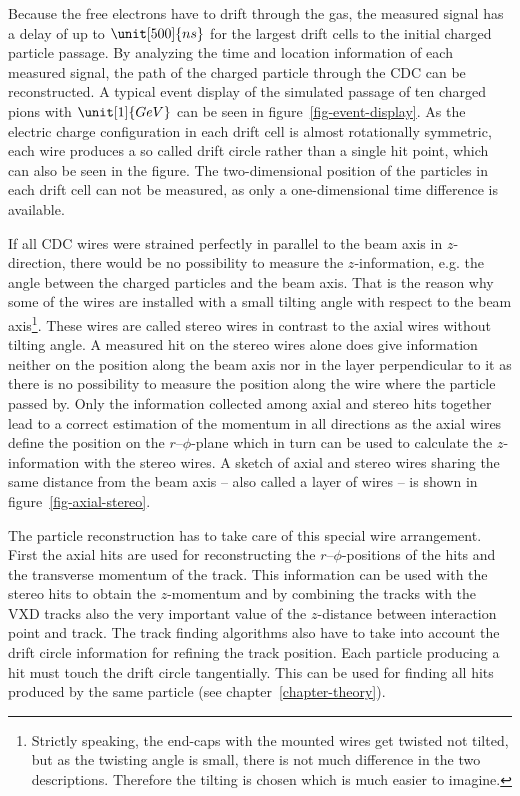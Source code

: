 Because the free electrons have to drift through the gas, the measured signal has a delay of up to $\unit[500]{ns}$ for the largest drift cells to the initial charged particle passage. By analyzing the time and location information of each measured signal, the path of the charged particle through the CDC can be reconstructed. A typical event display of the simulated passage of ten charged pions with $\unit[1]{GeV}$ can be seen in figure~\ref{fig-event-display}. As the electric charge configuration in each drift cell is almost rotationally symmetric, each wire produces a so called drift circle rather than a single hit point, which can also be seen in the figure. The two-dimensional position of the particles in each drift cell can not be measured, as only a one-dimensional time difference is available.

If all CDC wires were strained perfectly in parallel to the beam axis in $z$-direction, there would be no possibility to measure the $z$-information, e.g. the angle between the charged particles and the beam axis. That is the reason why some of the wires are installed with a small tilting angle with respect to the beam axis\footnote{Strictly speaking, the end-caps with the mounted wires get twisted not tilted, but as the twisting angle is small, there is not much difference in the two descriptions. Therefore the tilting is chosen which is much easier to imagine.}. These wires are called stereo wires in contrast to the axial wires without tilting angle. A measured hit on the stereo wires alone does give information neither on the position along the beam axis nor in the layer perpendicular to it as there is no possibility to measure the position along the wire where the particle passed by. Only the information collected among axial and stereo hits together lead to a correct estimation of the momentum in all directions as the axial wires define the position on the $r$--$\phi$-plane which in turn can be used to calculate the $z$-information with the stereo wires. A sketch of axial and stereo wires sharing the same distance from the beam axis -- also called a layer of wires -- is shown in figure~\ref{fig-axial-stereo}. 

The particle reconstruction has to take care of this special wire arrangement. First the axial hits are used for reconstructing the $r$--$\phi$-positions of the hits and the transverse momentum of the track. This information can be used with the stereo hits to obtain the $z$-momentum and by combining the tracks with the VXD tracks also the very important value of the $z$-distance between interaction point and track. The track finding algorithms also have to take into account the drift circle information for refining the track position. Each particle producing a hit must touch the drift circle tangentially. This can be used for finding all hits produced by the same particle (see chapter~\ref{chapter-theory}).

